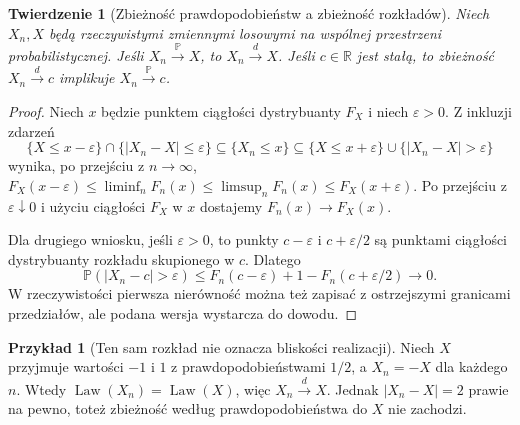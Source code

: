 \documentclass[11pt,a4paper,oneside]{report}
\numberwithin{equation}{chapter}
\theoremstyle{plain}
\newtheorem{twierdzenie}{Twierdzenie}[chapter]
\theoremstyle{definition}
\newtheorem{przyklad}{Przykład}[chapter]
\theoremstyle{remark}
\newcommand{\R}{\mathbb{R}}
\newcommand{\Prob}{\mathbb{P}}
\newcommand{\Law}{\operatorname{Law}}
\begin{document}
\begin{twierdzenie}[Zbieżność prawdopodobieństw a zbieżność rozkładów]
Niech $X_n,X$ będą rzeczywistymi zmiennymi losowymi
na wspólnej przestrzeni probabilistycznej.
Jeśli $X_n\xrightarrow{\Prob}X$, to
$X_n\xrightarrow{d}X$.
Jeśli $c\in\R$ jest stałą, to zbieżność
$X_n\xrightarrow{d}c$ implikuje
$X_n\xrightarrow{\Prob}c$.
\end{twierdzenie}
\begin{proof}
Niech $x$ będzie punktem ciągłości dystrybuanty $F_X$
i niech $\varepsilon>0$. Z inkluzji zdarzeń
\[
\{X\leq x-\varepsilon\}\cap\{|X_n-X|\leq\varepsilon\}
\subseteq\{X_n\leq x\}
\subseteq\{X\leq x+\varepsilon\}\cup
\{|X_n-X|>\varepsilon\}
\]
wynika, po przejściu z $n\to\infty$,
$F_X(x-\varepsilon)\leq\liminf_nF_n(x)
\leq\limsup_nF_n(x)\leq F_X(x+\varepsilon)$.
Po przejściu z $\varepsilon\downarrow0$ i użyciu
ciągłości $F_X$ w $x$ dostajemy $F_n(x)\to F_X(x)$.

Dla drugiego wniosku, jeśli $\varepsilon>0$,
to punkty $c-\varepsilon$ i $c+\varepsilon/2$
są punktami ciągłości dystrybuanty rozkładu
skupionego w $c$. Dlatego
\[
\Prob(|X_n-c|>\varepsilon)
\leq F_n(c-\varepsilon)
 +1-F_n(c+\varepsilon/2)\longrightarrow0.
\]
W rzeczywistości pierwsza nierówność można też
zapisać z ostrzejszymi granicami przedziałów,
ale podana wersja wystarcza do dowodu.
\end{proof}

\begin{przyklad}[Ten sam rozkład nie oznacza bliskości realizacji]
Niech $X$ przyjmuje wartości $-1$ i $1$ z
prawdopodobieństwami $1/2$, a $X_n=-X$ dla każdego $n$.
Wtedy $\Law(X_n)=\Law(X)$, więc $X_n\xrightarrow{d}X$.
Jednak $|X_n-X|=2$ prawie na pewno, toteż zbieżność
według prawdopodobieństwa do $X$ nie zachodzi.
\end{przyklad}
\end{document}
